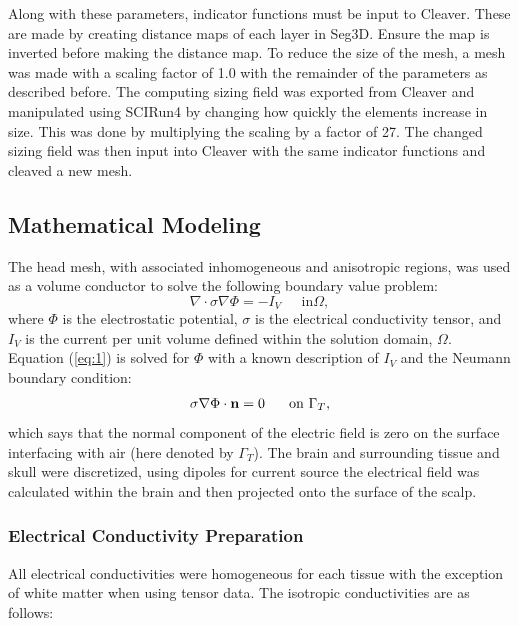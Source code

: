  Along with these parameters, indicator functions must be input to Cleaver. These are made by creating distance maps of each layer in Seg3D. Ensure the map is inverted before making the distance map. To reduce the size of the mesh, a mesh was made with a scaling factor of 1.0 with the remainder of the parameters as described before. The computing sizing field was exported from Cleaver and manipulated using SCIRun4 by changing how quickly the elements increase in size. This was done by multiplying the scaling by a factor of 27. The changed sizing field was then input into Cleaver with the same indicator functions and cleaved a new mesh.

\subsection{Mathematical Modeling}
\label{sec:math}


The head mesh, with associated inhomogeneous and anisotropic regions, was used as a volume conductor to solve the following boundary value problem:
%
\begin{equation}
\label{eq:1} \nabla\cdot\sigma\nabla\Phi = -I_{V} \;\;\;\;\mbox{ in
}\Omega,
\end{equation} 
%
where $\Phi$ is the electrostatic potential, $\sigma$ is the electrical conductivity tensor, and $I_{V}$ is the current per unit volume defined within the solution domain, $\Omega$. Equation (\ref{eq:1}) is solved for $\Phi$ with a known description of $I_{V}$ and the Neumann boundary condition:
%
\begin{equation} \sigma\nabla\Phi\cdot{\bf
n} = 0\;\;\;\;\;\mbox{ on }\Gamma_{T}, 
\end{equation} 
%
which says that the normal component of the electric field is zero on the surface interfacing with air (here denoted by $\Gamma_{T}$). The brain and surrounding tissue and skull were discretized, using dipoles for current source the electrical field was calculated within the brain and then projected onto the surface of the scalp. \cite{ref:math}

\subsubsection{Electrical Conductivity Preparation}
\label{sec:cond}

All electrical conductivities were homogeneous for each tissue with the exception of white matter when using tensor data. The isotropic conductivities \cite{ref:cond} are as follows: 

